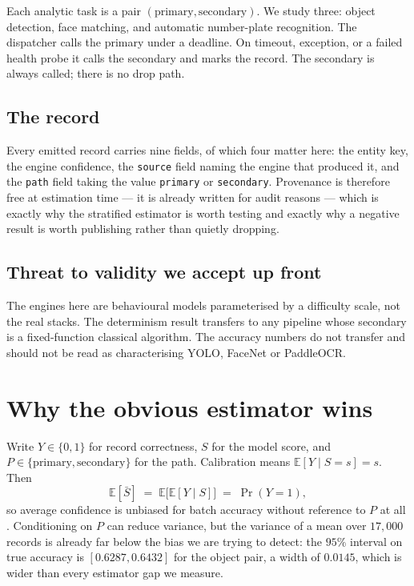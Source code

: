 \documentclass[11pt,a4paper]{article}
\begin{document}
Each analytic task is a pair $(\text{primary}, \text{secondary})$. We study three:
object detection, face matching, and automatic number-plate recognition. The
dispatcher calls the primary under a deadline. On timeout, exception, or a failed
health probe it calls the secondary and marks the record. The secondary is always
called; there is no drop path.

\subsection{The record}

Every emitted record carries nine fields, of which four matter here: the entity
key, the engine confidence, the \texttt{source} field naming the engine that
produced it, and the \texttt{path} field taking the value \texttt{primary} or
\texttt{secondary}. Provenance is therefore free at estimation time --- it is
already written for audit reasons --- which is exactly why the stratified estimator
is worth testing and exactly why a negative result is worth publishing rather
than quietly dropping.

\subsection{Threat to validity we accept up front}

The engines here are behavioural models parameterised by a difficulty scale, not
the real stacks. The determinism result transfers to any pipeline whose secondary
is a fixed-function classical algorithm. The accuracy numbers do not transfer and
should not be read as characterising YOLO, FaceNet or PaddleOCR.

\section{Why the obvious estimator wins}
\label{sec:why}

Write $Y \in \{0,1\}$ for record correctness, $S$ for the model score, and
$P \in \{\text{primary}, \text{secondary}\}$ for the path. Calibration means
$\mathbb{E}[Y \mid S = s] = s$. Then
\[
\mathbb{E}[\bar{S}] \;=\; \mathbb{E}\big[\mathbb{E}[Y \mid S]\big] \;=\; \Pr(Y=1),
\]
so average confidence is unbiased for batch accuracy without reference to $P$ at
all \citep{kivimaki2025confidence}. Conditioning on $P$ can reduce variance, but
the variance of a mean over $17{,}000$ records is already far below the bias we
are trying to detect: the $95\%$ interval on true accuracy is
$[0.6287, 0.6432]$ for the object pair, a width of $0.0145$, which is wider than
every estimator gap we measure.
\end{document}
